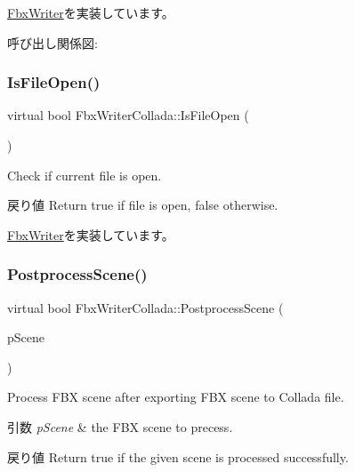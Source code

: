 \hyperlink{class_fbx_writer_ad237f5cd183ae29f744aee32b7aa5525}{Fbx\+Writer}を実装しています。

呼び出し関係図\+:
\mbox{\label{class_fbx_writer_collada_a77c117aa61d57faf57e6810823938cbd}} 
\subsubsection{\texorpdfstring{Is\+File\+Open()}{IsFileOpen()}}
{\footnotesize\ttfamily virtual bool Fbx\+Writer\+Collada\+::\+Is\+File\+Open (\begin{DoxyParamCaption}{ }\end{DoxyParamCaption})\hspace{0.3cm}{\ttfamily [virtual]}}

Check if current file is open. \begin{DoxyReturn}{戻り値}
Return true if file is open, false otherwise. 
\end{DoxyReturn}


\hyperlink{class_fbx_writer_ab70be3aaebd304af11cdce5e225cce68}{Fbx\+Writer}を実装しています。

\mbox{\label{class_fbx_writer_collada_a3f03c5f945df442ecba81efa7d531c64}} 
\subsubsection{\texorpdfstring{Postprocess\+Scene()}{PostprocessScene()}}
{\footnotesize\ttfamily virtual bool Fbx\+Writer\+Collada\+::\+Postprocess\+Scene (\begin{DoxyParamCaption}\item[{\hyperlink{class_fbx_scene}{Fbx\+Scene} \&}]{p\+Scene }\end{DoxyParamCaption})\hspace{0.3cm}{\ttfamily [virtual]}}

Process F\+BX scene after exporting F\+BX scene to Collada file. 
\begin{DoxyParams}{引数}
{\em p\+Scene} & the F\+BX scene to precess. \\
\hline
\end{DoxyParams}
\begin{DoxyReturn}{戻り値}
Return true if the given scene is processed successfully. 
\end{DoxyReturn}


